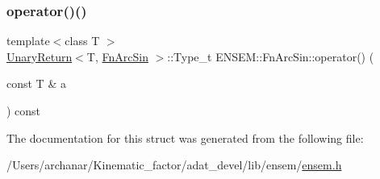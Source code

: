 \mbox{\label{structENSEM_1_1FnArcSin_a2b5019522f59b30d6320947daae37df8}} 
\subsubsection{\texorpdfstring{operator()()}{operator()()}\hspace{0.1cm}{\footnotesize\ttfamily [2/2]}}
{\footnotesize\ttfamily template$<$class T $>$ \\
\mbox{\hyperlink{structENSEM_1_1UnaryReturn}{Unary\+Return}}$<$T, \mbox{\hyperlink{structENSEM_1_1FnArcSin}{Fn\+Arc\+Sin}} $>$\+::Type\+\_\+t E\+N\+S\+E\+M\+::\+Fn\+Arc\+Sin\+::operator() (\begin{DoxyParamCaption}\item[{const T \&}]{a }\end{DoxyParamCaption}) const\hspace{0.3cm}{\ttfamily [inline]}}



The documentation for this struct was generated from the following file\+:\begin{DoxyCompactItemize}
\item 
/\+Users/archanar/\+Kinematic\+\_\+factor/adat\+\_\+devel/lib/ensem/\mbox{\hyperlink{lib_2ensem_2ensem_8h}{ensem.\+h}}\end{DoxyCompactItemize}
